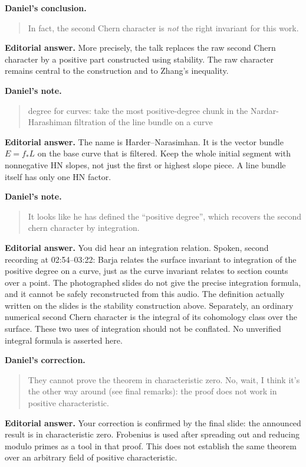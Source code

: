 \begin{remark}
\label{remark-barja-daniel-wrong-invariant}
{\bf Daniel's conclusion.}
\begin{quote}
In fact, the second Chern character is
\emph{not} the right invariant for this
work.
\end{quote}
{\bf Editorial answer.}
More precisely, the talk replaces the raw
second Chern character by a positive part
constructed using stability. The raw
character remains central to the
construction and to Zhang's inequality.
\end{remark}

\begin{remark}
\label{remark-barja-daniel-hn}
{\bf Daniel's note.}
\begin{quote}
degree for curves: take the most
positive-degree chunk in the
Nardar-Hara\-shiman filtration of the line
bundle on a curve
\end{quote}
{\bf Editorial answer.}
The name is Harder--Narasimhan.
It is the vector bundle $E=f_*L$ on the
base curve that is filtered. Keep the
whole initial segment with nonnegative
HN slopes, not just the first or highest
slope piece. A line bundle itself has
only one HN factor.
\end{remark}

\begin{remark}
\label{remark-barja-daniel-integration}
{\bf Daniel's note.}
\begin{quote}
It looks like he has defined the
``positive degree'', which recovers the
second chern character by integration.
\end{quote}
{\bf Editorial answer.}
You did hear an integration relation.
Spoken, second recording at 02:54--03:22:
Barja relates the surface invariant to
integration of the positive degree on a
curve, just as the curve invariant relates
to section counts over a point.
The photographed slides do not give the
precise integration formula, and it cannot
be safely reconstructed from this audio.
The definition actually written on the
slides is the stability construction
above. Separately, an ordinary numerical
second Chern character is the integral of
its cohomology class over the surface.
These two uses of integration should not
be conflated. No unverified integral
formula is asserted here.
\end{remark}

\begin{remark}
\label{remark-barja-daniel-characteristic}
{\bf Daniel's correction.}
\begin{quote}
They cannot prove the theorem in
characteristic zero. No, wait, I think
it's the other way around (see final
remarks): the proof does not work in
positive characteristic.
\end{quote}
{\bf Editorial answer.}
Your correction is confirmed by the final
slide: the announced result is in
characteristic zero. Frobenius is used
after spreading out and reducing modulo
primes as a tool in that proof. This does
not establish the same theorem over an
arbitrary field of positive
characteristic.
\end{remark}





